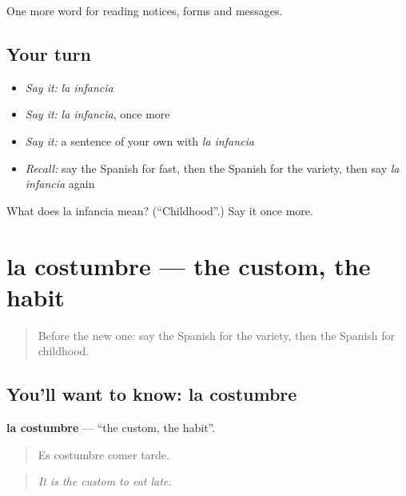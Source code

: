 \begin{grammarlens}[title={What you've built}]
One more word for reading notices, forms and messages.
\end{grammarlens}

\subsection*{Your turn}
\begin{itemize}
\raggedright
  \item \emph{Say it:} \emph{la infancia}
  \item \emph{Say it:} \emph{la infancia}, once more
  \item \emph{Say it:} a sentence of your own with \emph{la infancia}
  \item \emph{Recall:} say the Spanish for fast, then the Spanish for the variety, then say \emph{la infancia} again
\end{itemize}

\begin{tcolorbox}[breakable,colback=teal!4,colframe=teal!35!black,title={Before you move on}]
What does la infancia mean? (\textquotedblleft{}Childhood\textquotedblright{}.) Say it once more.
\end{tcolorbox}
\section[la costumbre]{la costumbre — the custom, the habit}

\label{lesson:ES-C483-costumbre}



\begin{quote}
Before the new one: say the Spanish for the variety, then the Spanish for childhood.
\end{quote}

\subsection*{You'll want to know: la costumbre}
\textbf{la costumbre} — \textquotedblleft{}the custom, the habit\textquotedblright{}.

\begin{quote}
Es costumbre comer tarde.
\end{quote}

\begin{quote}
\emph{It is the custom to eat late.}
\end{quote}

